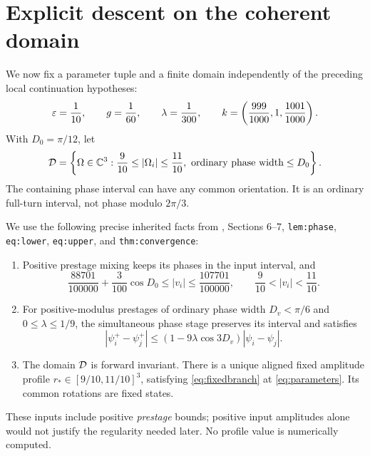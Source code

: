 \section{Explicit descent on the coherent domain}\label{sec:finite}

We now fix a parameter tuple and a finite domain independently of the preceding local continuation hypotheses:
\begin{equation}
\varepsilon=\frac1{10},\qquad g=\frac1{60},\qquad
\lambda=\frac1{300},\qquad
k=\left(\frac{999}{1000},1,\frac{1001}{1000}\right).
\label{eq:parameters}
\end{equation}
With \(D_0=\pi/12\), let
\begin{equation}
\mathcal D=\left\{\Omega\in\mathbb C^3:
\frac9{10}\le|\Omega_i|\le\frac{11}{10},\
\text{ordinary phase width}\le D_0\right\}.
\label{eq:domain}
\end{equation}
The containing phase interval can have any common orientation. It is an ordinary full-turn interval, not phase modulo \(2\pi/3\).

We use the following precise inherited facts from \cite{relaxation}, Sections 6--7, \texttt{lem:phase}, \texttt{eq:lower}, \texttt{eq:upper}, and \texttt{thm:convergence}:
\begin{enumerate}
\item Positive prestage mixing keeps its phases in the input interval, and
\begin{equation}
\frac{88701}{100000}+\frac3{100}\cos D_0
\le |v_i|\le\frac{107701}{100000},\qquad
\frac9{10}<|v_i|<\frac{11}{10}.
\label{eq:prebounds}
\end{equation}
\item For positive-modulus prestages of ordinary phase width \(D_v<\pi/6\) and \(0\le\lambda\le1/9\), the simultaneous phase stage preserves its interval and satisfies
\begin{equation}
|\psi_i^+-\psi_j^+|
\le(1-9\lambda\cos3D_v)|\psi_i-\psi_j|.
\label{eq:phasebound}
\end{equation}
\item The domain \(\mathcal D\) is forward invariant. There is a unique aligned fixed amplitude profile \(r_*\in[9/10,11/10]^3\), satisfying \eqref{eq:fixedbranch} at \eqref{eq:parameters}. Its common rotations are fixed states.
\end{enumerate}
These inputs include positive \emph{prestage} bounds; positive input amplitudes alone would not justify the regularity needed later. No profile value is numerically computed.

